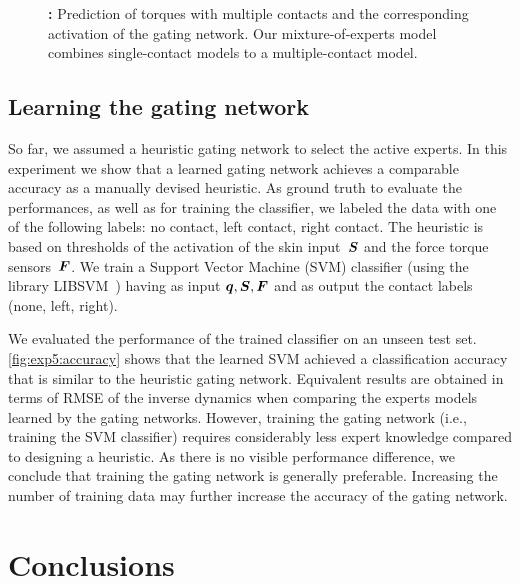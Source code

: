 \begin{figure}[t]
\begin{minipage}{.52\linewidth}
			\caption{\textbf{:} Prediction of torques with multiple contacts and the corresponding activation of the gating network.
			Our mixture-of-experts model combines single-contact models to a multiple-contact model.
			}
			\label{fig:exp3:gating}
		\end{minipage}	
	\end{figure}

\subsection{Learning the gating network}
\label{sec:results:exp5}

	So far, we assumed a heuristic gating network to select the active experts.
	In this experiment we show that a learned gating network achieves a comparable accuracy as a manually devised heuristic.
    As ground truth to evaluate the performances, as well as for training the classifier, we labeled the data with one of the following labels: no contact, left contact, right contact.
    The heuristic is based on thresholds of the activation of the skin input~$\mathcal{\boldsymbol{S}}$ and the force torque sensors~$\boldsymbol{F}$.
	We train a Support Vector Machine (SVM) classifier (using the library LIBSVM~\cite{Chang2011}) having as input $\boldsymbol q, \mathcal{\boldsymbol{S}}, \boldsymbol{F}$ and as output the contact labels (none, left, right).

	We evaluated the performance of the trained classifier on an unseen test set.
	\fig\ref{fig:exp5:accuracy} shows that the learned SVM achieved a classification accuracy that is similar to the heuristic gating network. 
    Equivalent results are obtained in terms of RMSE of the inverse dynamics when comparing the experts models learned by the gating networks.
    However, training the gating network (i.e., training the SVM classifier) requires considerably less expert knowledge compared to designing a heuristic. 
    As there is no visible performance difference, we conclude that training the gating network is generally preferable.
Increasing the number of training data may further increase the accuracy of the gating network.




\section{Conclusions}
\label{sec:conclusion}

